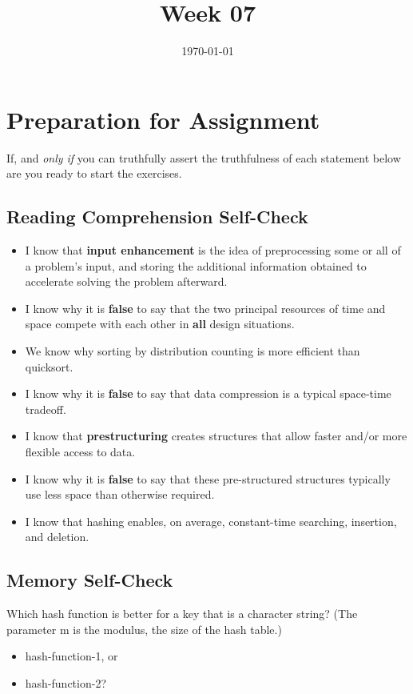 \documentclass[12pt]{amsart}
\title{Week 07}
\date{\today}
\begin{document}
	\maketitle
	
	\section{Preparation for Assignment}
	If, and \textit{only if} you can truthfully assert the truthfulness of each statement below are you ready to start the exercises.
	\subsection {Reading Comprehension Self-Check}
	\begin{itemize}
		\item I know that \textbf{input enhancement} is the idea of preprocessing some or all of a problem\textquoteright s input, and storing the additional information obtained to accelerate solving the problem afterward.
		\item I know why it is \textbf{false} to say that the two principal resources of
		time and space compete with each other in \textbf{all} design situations.
		\item We know why sorting by distribution counting is more efficient than
		quicksort.
		\item I know why it is \textbf{false} to say that data compression is a typical
		space-time tradeoff.
		\item I know that \textbf{prestructuring} creates structures that allow faster
		and/or more flexible access to data.
		\item I know why it is \textbf{false} to say that these pre-structured structures
		typically use less space than otherwise required.
		\item I know that hashing enables, on average, constant-time searching,
		insertion, and deletion.
		
	\end{itemize}
	\subsection{Memory Self-Check}
	Which hash function is better for a key that is a character string? (The
	parameter m is the modulus, the size of the hash table.)
	\begin{itemize}
		\item hash-function-1, or
		\item hash-function-2?
	\end{itemize}
	
\end{document}
